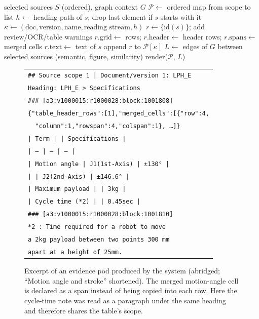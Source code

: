 \documentclass[conference]{IEEEtran}
\begin{document}
\begin{algorithm}[t]
\caption{Evidence pod serialization}\label{alg:pods}
\begin{algorithmic}[1]
\Require selected sources $S$ (ordered), graph context $G$
\State $\mathcal{P}\gets$ ordered map from scope to list
  \State $h\gets$ heading path of $s$; drop last element if $s$ starts with it
  \State $\kappa\gets(\text{doc},\text{version},\text{name},\text{reading stream},h)$
  \State $r\gets\{\text{id}(s)\}$; add review/OCR/table warnings
    \State $r.\text{grid}\gets$ rows; $r.\text{header}\gets$ header rows; $r.\text{spans}\gets$ merged cells
  \Else \State $r.\text{text}\gets$ text of $s$ \EndIf
  \State append $r$ to $\mathcal{P}[\kappa]$
\EndFor
\State $L\gets$ edges of $G$ between selected sources (semantic, figure, similarity)
\State \Return render($\mathcal{P}$, $L$)
\end{algorithmic}
\end{algorithm}

\begin{figure}[t]
\centering
\footnotesize
\begin{tabular}{@{}p{}@{}}
\toprule
\texttt{\#\# Source scope 1 | Document/version 1: LPH\_E}\\
\texttt{Heading: LPH\_E > Specifications}\\
\texttt{\#\#\# [a3:v1000015:r1000028:block:1001808]}\\
\texttt{\{"table\_header\_rows":[1],"merged\_cells":[\{"row":4,}\\
\texttt{\ \ "column":1,"rowspan":4,"colspan":1\}, \ldots]\}}\\
\texttt{| Term | | Specifications |}\\
\texttt{| --- | --- | --- |}\\
\texttt{| Motion angle | J1(1st-Axis) | ±130° |}\\
\texttt{| | J2(2nd-Axis) | ±146.6° |}\\
\texttt{| Maximum payload | | 3kg |}\\
\texttt{| Cycle time (*2) | | 0.45sec |}\\
\texttt{\#\#\# [a3:v1000015:r1000028:block:1001810]}\\
\texttt{*2 : Time required for a robot to move}\\
\texttt{a 2kg payload between two points 300 mm}\\
\texttt{apart at a height of 25mm.}\\
\bottomrule
\end{tabular}
\caption{Excerpt of an evidence pod produced by the system (abridged; ``Motion angle and stroke'' shortened). The merged motion-angle cell is declared as a span instead of being copied into each row. Here the cycle-time note was read as a paragraph under the same heading and therefore shares the table's scope.}
\label{fig:pod}
\end{figure}
\end{document}
